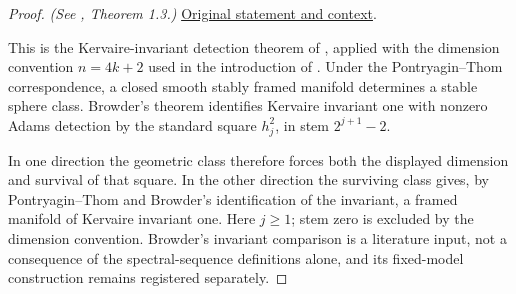 \begin{proof}
\textit{(See \cite{LWX126}, Theorem 1.3.)} \href{paper/main.tex.html#L117}{Original statement and context}.

This is the Kervaire-invariant detection theorem of \cite{Browder}, applied with the dimension convention $n=4k+2$ used in the introduction of \cite{LWX126}. Under the Pontryagin--Thom correspondence, a closed smooth stably framed manifold determines a stable sphere class. Browder's theorem identifies Kervaire invariant one with nonzero Adams detection by the standard square $h_j^2$, in stem $2^{j+1}-2$.

In one direction the geometric class therefore forces both the displayed dimension and survival of that square. In the other direction the surviving class gives, by Pontryagin--Thom and Browder's identification of the invariant, a framed manifold of Kervaire invariant one. Here $j\ge1$; stem zero is excluded by the dimension convention. Browder's invariant comparison is a literature input, not a consequence of the spectral-sequence definitions alone, and its fixed-model construction remains registered separately.
\end{proof}
